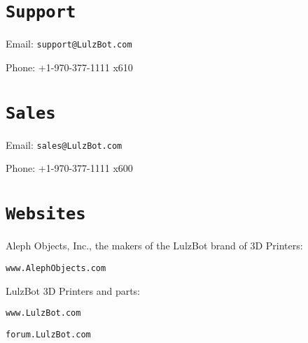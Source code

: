 %
%
%
%
%

\section{\texttt{Support}}
\setlength{\parindent}{0pt}
Email: \texttt{support@LulzBot.com}

Phone: +1-970-377-1111 x610

\section{\texttt{Sales}}

Email: \texttt{sales@LulzBot.com}

Phone: +1-970-377-1111 x600

\section{\texttt{Websites}}

Aleph Objects, Inc., the makers of the LulzBot\textsuperscript{\miniscule{\textregistered}} brand of 3D Printers:

\texttt{www.AlephObjects.com}


LulzBot 3D Printers and parts:

\texttt{www.LulzBot.com}

\texttt{forum.LulzBot.com}
